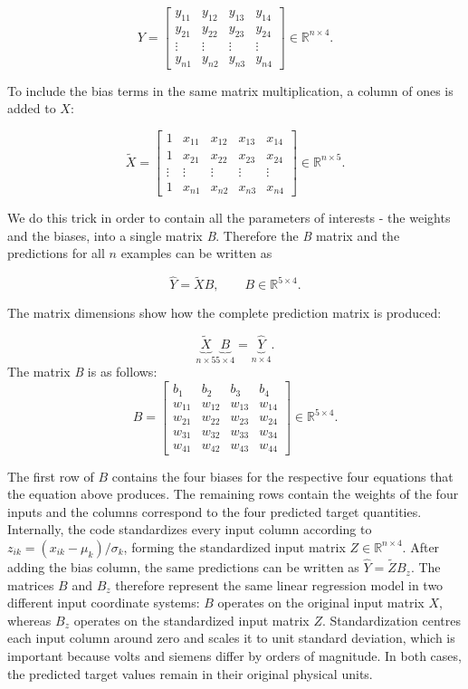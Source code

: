 \documentclass[11pt,a4paper]{article}
\begin{document}
\[
Y=
\begin{bmatrix}
y_{11} & y_{12} & y_{13} & y_{14} \\
y_{21} & y_{22} & y_{23} & y_{24} \\
\vdots & \vdots & \vdots & \vdots \\
y_{n1} & y_{n2} & y_{n3} & y_{n4}
\end{bmatrix}
\in\mathbb{R}^{n\times4}.
\]

To include the bias terms in the same matrix multiplication, a column of ones is added to $X$:

\[
\widetilde{X}=
\begin{bmatrix}
1 & x_{11} & x_{12} & x_{13} & x_{14} \\
1 & x_{21} & x_{22} & x_{23} & x_{24} \\
\vdots & \vdots & \vdots & \vdots & \vdots \\
1 & x_{n1} & x_{n2} & x_{n3} & x_{n4}
\end{bmatrix}
\in\mathbb{R}^{n\times5}.
\]

We do this trick in order to contain all the parameters of interests - the weights and the biases, into a single matrix \textit{B}. Therefore the \textit{B} matrix and the predictions for all $n$ examples can be written as

\[
\widehat{Y}=\widetilde{X}B,
\qquad B\in\mathbb{R}^{5\times4}.
\]

The matrix dimensions show how the complete prediction matrix is produced:

\[
\underbrace{\widetilde{X}}_{n\times5}
\underbrace{B}_{5\times4}
=
\underbrace{\widehat{Y}}_{n\times4}.\]
The matrix \textit{B} is as follows:
\[
B=
\begin{bmatrix}
b_1 & b_2 & b_3 & b_4 \\
w_{11} & w_{12} & w_{13} & w_{14} \\
w_{21} & w_{22} & w_{23} & w_{24} \\
w_{31} & w_{32} & w_{33} & w_{34} \\
w_{41} & w_{42} & w_{43} & w_{44}
\end{bmatrix}
\in\mathbb{R}^{5\times4}.
\]

The first row of $B$ contains the four biases for the respective four equations that the equation above produces. The remaining rows contain the weights of the four inputs and the columns correspond to the
four predicted target quantities. Internally, the code standardizes every input column according to $z_{ik}=(x_{ik}-\mu_k)/\sigma_k$, forming the standardized input matrix $Z\in\mathbb{R}^{n\times4}$. After adding the bias column, the same predictions can be written as $\widehat{Y}=\widetilde{Z}B_z$. The matrices $B$ and $B_z$ therefore represent the same linear regression model in two different input coordinate systems: $B$ operates on the original input matrix $X$, whereas $B_z$ operates on the standardized input matrix $Z$. Standardization centres each input column around zero and scales it to unit standard deviation, which is important because volts and siemens differ by orders of magnitude. In both cases, the predicted target values remain in their original physical units.
\end{document}
